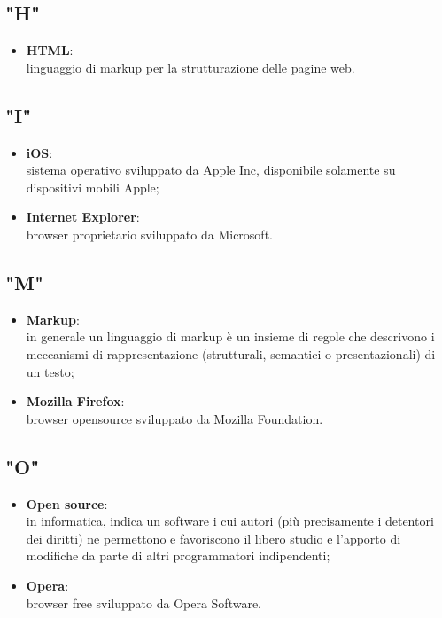 \subsection*{"H"}
\begin{itemize}
\item \textbf{HTML}:\\ linguaggio di markup per la strutturazione delle pagine web.
\end{itemize}

\subsection*{"I"}
\begin{itemize}
\item \textbf{iOS}:\\ sistema operativo sviluppato da Apple Inc, disponibile solamente su dispositivi mobili Apple;
\item \textbf{Internet Explorer}:\\ browser proprietario sviluppato da Microsoft.
\end{itemize}

\subsection*{"M"}
\begin{itemize}
\item \textbf{Markup}:\\ in generale un linguaggio di markup è un insieme di regole che descrivono i meccanismi di rappresentazione (strutturali, semantici o presentazionali) di un testo;
\item \textbf{Mozilla Firefox}:\\ browser opensource sviluppato da Mozilla Foundation.
\end{itemize}

\subsection*{"O"}
\begin{itemize}
\item \textbf{Open source}:\\ in informatica, indica un software i cui autori (più precisamente i detentori dei diritti) ne permettono e favoriscono il libero studio e l'apporto di modifiche da parte di altri programmatori indipendenti;
\item \textbf{Opera}:\\ browser free sviluppato da Opera Software.
\end{itemize}

